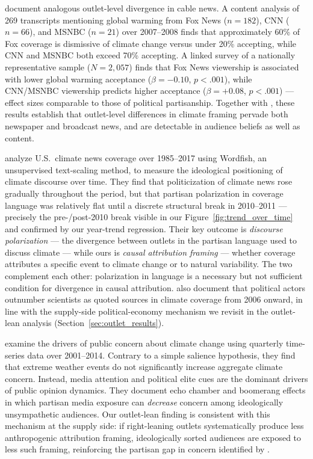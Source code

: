 \documentclass[12pt]{article}
\begin{document}
\citet{feldman2012} document analogous outlet-level divergence in cable
news.  A content analysis of 269 transcripts mentioning global warming
from Fox News ($n=182$), CNN ($n=66$), and MSNBC ($n=21$) over 2007--2008
finds that approximately 60\% of Fox coverage is dismissive of climate
change versus under 20\% accepting, while CNN and MSNBC both exceed
70\% accepting.  A linked survey of a nationally representative sample
($N = 2{,}057$) finds that Fox News viewership is associated with lower
global warming acceptance ($\beta = -0.10$, $p<.001$), while CNN/MSNBC
viewership predicts higher acceptance ($\beta = +0.08$, $p<.001$) ---
effect sizes comparable to those of political partisanship.  Together
with \citet{feldman2017}, these results establish that outlet-level
differences in climate framing pervade both newspaper and broadcast
news, and are detectable in audience beliefs as well as content.

\citet{chinn2020} analyze U.S.\ climate news coverage over 1985--2017
using Wordfish, an unsupervised text-scaling method, to measure the
ideological positioning of climate discourse over time.  They find that
politicization of climate news rose gradually throughout the period,
but that partisan polarization in coverage language was relatively flat
until a discrete structural break in 2010--2011 --- precisely the
pre-/post-2010 break visible in our Figure~\ref{fig:trend_over_time}
and confirmed by our year-trend regression.  Their key outcome is
\emph{discourse polarization} --- the divergence between outlets in the
partisan language used to discuss climate --- while ours is \emph{causal
attribution framing} --- whether coverage attributes a specific event to
climate change or to natural variability.  The two complement each
other: polarization in language is a necessary but not sufficient
condition for divergence in causal attribution.  \citet{chinn2020} also
document that political actors outnumber scientists as quoted sources in
climate coverage from 2006 onward, in line with the supply-side
political-economy mechanism we revisit in the outlet-lean analysis
(Section~\ref{sec:outlet_results}).

\citet{carmichael2017} examine the drivers of public concern about
climate change using quarterly time-series data over 2001--2014.
Contrary to a simple salience hypothesis, they find that extreme weather
events do not significantly increase aggregate climate concern.  Instead,
media attention and political elite cues are the dominant drivers of
public opinion dynamics.  They document echo chamber and boomerang
effects in which partisan media exposure can \emph{decrease} concern
among ideologically unsympathetic audiences.  Our outlet-lean finding is
consistent with this mechanism at the supply side: if right-leaning
outlets systematically produce less anthropogenic attribution framing,
ideologically sorted audiences are exposed to less such framing,
reinforcing the partisan gap in concern identified by
\citet{carmichael2017}.
\end{document}
